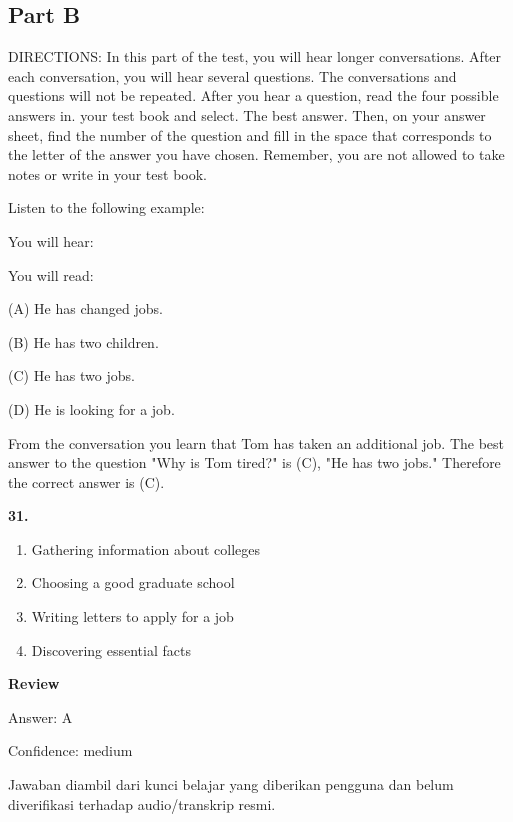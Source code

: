 \documentclass[12pt]{article}
\begin{document}
\subsection*{Part B}
DIRECTIONS: In this part of the test, you will hear longer conversations. After each conversation, you will hear several questions. The conversations and questions will not be repeated. After you hear a question, read the four possible answers in. your test book and select. The best answer. Then, on your answer sheet, find the number of the question and fill in the space that corresponds to the letter of the answer you have chosen. Remember, you are not allowed to take notes or write in your test book.\par
\begin{exampleblock}
Listen to the following example:\par
You will hear:\par
You will read:\par
(A) He has changed jobs.\par
(B) He has two children.\par
(C) He has two jobs.\par
(D) He is looking for a job.\par
From the conversation you learn that Tom has taken an additional job. The best answer to the question "Why is Tom tired?" is (C), "He has two jobs." Therefore the correct answer is (C).\par
\end{exampleblock}
\noindent\textbf{31.}
\begin{enumerate}[label=(\Alph*),leftmargin=*,itemsep=0.2em]
\item Gathering information about colleges
\item Choosing a good graduate school
\item Writing letters to apply for a job
\item Discovering essential facts
\end{enumerate}
\par
\begingroup
\setlength{\parskip}{0pt}
\setlength{\parindent}{0pt}
\textbf{Review}\par
Answer: A\par
Confidence: medium\par
Jawaban diambil dari kunci belajar yang diberikan pengguna dan belum diverifikasi terhadap audio/transkrip resmi.\par
\endgroup
\par
\vspace{0.25\baselineskip}
\end{document}
